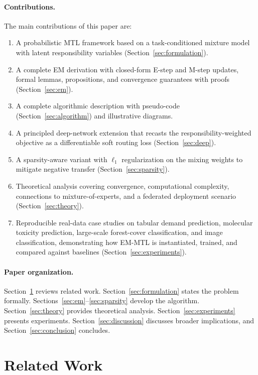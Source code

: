 \documentclass[preprint,12pt]{elsarticle}
\begin{document}
	\paragraph{Contributions.} The main contributions of this paper are:
	\begin{enumerate}
		\item A probabilistic MTL framework based on a task-conditioned
		mixture model with latent responsibility variables
		(Section~\ref{sec:formulation}).
		\item A complete EM derivation with closed-form E-step and M-step
		updates, formal lemmas, propositions, and convergence
		guarantees with proofs (Section~\ref{sec:em}).
		\item A complete algorithmic description with pseudo-code
		(Section~\ref{sec:algorithm}) and illustrative diagrams.
		\item A principled deep-network extension that recasts the
		responsibility-weighted objective as a differentiable soft
		routing loss (Section~\ref{sec:deep}).
		\item A sparsity-aware variant with $\ell_1$ regularization on the
		mixing weights to mitigate negative transfer
		(Section~\ref{sec:sparsity}).
		\item Theoretical analysis covering convergence, computational
		complexity, connections to mixture-of-experts, and a
		federated deployment scenario (Section~\ref{sec:theory}).
		\item Reproducible real-data case studies on tabular demand
		prediction, molecular toxicity prediction, large-scale forest-cover
		classification, and image classification, demonstrating how EM-MTL is
		instantiated, trained, and compared against baselines
		(Section~\ref{sec:experiments}).
	\end{enumerate}
	
	\paragraph{Paper organization.} Section~\ref{sec:related} reviews
	related work. Section~\ref{sec:formulation} states the problem
	formally. Sections~\ref{sec:em}--\ref{sec:sparsity} develop the
	algorithm. Section~\ref{sec:theory} provides theoretical analysis.
	Section~\ref{sec:experiments} presents experiments. Section~\ref{sec:discussion}
	discusses broader implications, and Section~\ref{sec:conclusion}
	concludes.
	
	\section{Related Work}
	\label{sec:related}
	
\end{document}
